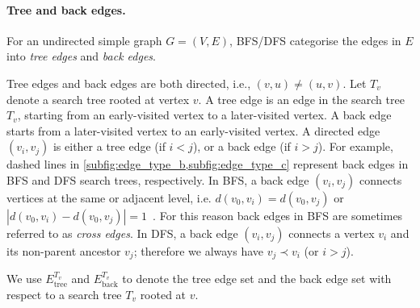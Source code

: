 \paragraph{Tree and back edges.} For an undirected simple graph $G=(V,E)$, BFS/DFS categorise the edges in $E$ into \emph{tree edges} and \emph{back edges}. 

Tree edges and back edges are both directed, i.e., $(v,u)\neq (u,v)$. Let $T_v$ denote a search tree rooted at vertex $v$. A tree edge is an edge in the search tree $T_v$, starting from an early-visited vertex to a later-visited vertex. A back edge starts from a later-visited vertex to an early-visited vertex.
A directed edge $(v_i, v_j)$ is either a tree edge (if $i<j$), or a back edge (if $i>j$).
For example, dashed lines in \cref{subfig:edge_type_b,subfig:edge_type_c} represent back edges in BFS and DFS search trees, respectively. 
In BFS, a back edge $(v_i, v_j)$ connects vertices at the same or adjacent level, i.e. $d(v_0,v_i) =d(v_0,v_j)$ or $|d(v_0,v_i) - d(v_0,v_j)| = 1$~\citep{Cormen_algointro}. For this reason back edges in BFS are sometimes referred to as \emph{cross edges}.
In DFS, a back edge $(v_i,v_j)$ connects a vertex $v_i$ and its non-parent ancestor $v_j$; therefore we always have $v_j\prec v_i$ (or $i>j$). 

We use $E_{\text{tree}}^{T_v}$ and $E_{\text{back}}^{T_v}$ to denote the tree edge set and the back edge set with respect to a search tree $T_v$ rooted at $v$. 








